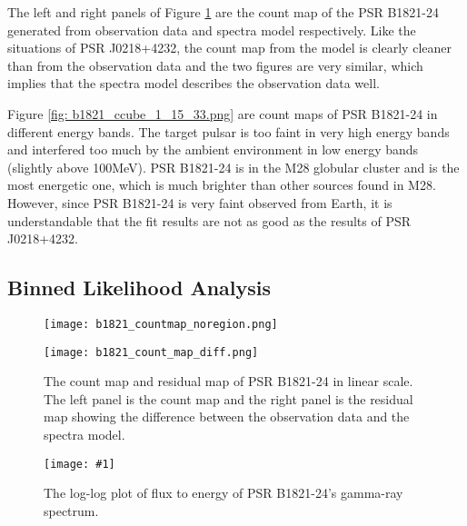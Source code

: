 \documentclass[12pt]{report}
\newcommand{\singleFig}[3]{
  \begin{figure}[!htp]
    \centering
    \texttt{[image: \#1]}
    \caption{#3}
    \label{fig: #1}
  \end{figure}
}
\begin{document}
      The left and right panels of Figure \ref{fig: b1821_count_map_diff.png} are the count 
      map of the PSR B1821-24 generated from observation data and spectra model respectively. 
      Like the situations of PSR J0218+4232, the count map from the model is clearly cleaner than 
      from the observation data and the two figures are very similar, which implies that 
      the spectra model describes the observation data well.  

      Figure \ref{fig: b1821_ccube_1_15_33.png} are count maps of PSR B1821-24 in 
      different energy bands. The target pulsar is too faint in very high energy bands 
      and interfered too much by the ambient environment in low energy bands 
      (slightly above 100MeV). PSR B1821-24 is in the M28 globular cluster and is the most 
      energetic one, which is much brighter than other sources found in M28. However, since 
      PSR B1821-24 is very faint observed from Earth, it is understandable that the fit 
      results are not as good as the results of PSR J0218+4232. 
    \subsection{Binned Likelihood Analysis}
      \begin{figure}[!ht]
        \begin{center}
        \begin{minipage}{0.45\textwidth}
          \begin{center} 
            \texttt{[image: b1821\_countmap\_noregion.png]}
          \end{center}
        \end{minipage}
        \begin{minipage}{0.45\textwidth}
          \begin{center}
            \texttt{[image: b1821\_count\_map\_diff.png]}
          \end{center}
        \end{minipage}
      \end{center}
      \caption{The count map and residual map of PSR B1821-24 in linear scale. 
        The left panel is the count map and the right panel is the residual map showing the 
        difference between the observation data and the spectra model.}
        \label{fig: b1821_count_map_diff.png}
      \end{figure}

      \singleFig{b1821_cur.png}{0.37}{The log-log plot of flux to energy of 
        PSR B1821-24's gamma-ray spectrum. }
      \vspace{1cm}
\end{document}
